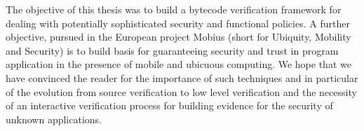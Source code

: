 The objective of this thesis was to build a bytecode verification framework
 for dealing with potentially sophisticated security and functional policies. A further objective, pursued in the European project
 Mobius (short for Ubiquity, Mobility and Security) 
is to build basis for guaranteeing security and trust in program application in the presence of mobile and ubicuous computing. We hope that we have convinced
the reader for the importance of such techniques and in particular of the evolution from source verification to
 low level verification  and the necessity of an interactive verification process for building evidence for the security of unknown applications. 
